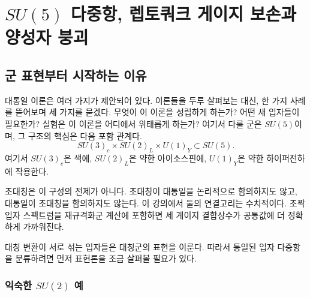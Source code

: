 \chapter{\texorpdfstring{\(SU(5)\)}{5} 다중항, 렙토쿼크 게이지 보손과 양성자 붕괴}


\section{군 표현부터 시작하는 이유}

대통일 이론은 여러 가지가 제안되어 있다. 이론들을 두루 살펴보는 대신, 한 가지 사례를 뜯어보며 세 가지를 묻겠다. 무엇이 이 이론을 성립하게 하는가? 어떤 새 입자들이 필요한가? 실험은 이 이론을 어디에서 위태롭게 하는가? 여기서 다룰 군은 \(SU(5)\)이며, 그 구조의 핵심은 다음 포함 관계다.
\begin{equation}
SU(3)_c\times SU(2)_L\times U(1)_Y
\subset SU(5).
\label{eq:l10-sm-embedding}
\end{equation}
여기서 \(SU(3)_c\)은 색에, \(SU(2)_L\)은 약한 아이소스핀에, \(U(1)_Y\)은 약한 하이퍼전하에 작용한다.

초대칭은 이 구성의 전제가 아니다. 초대칭이 대통일을 논리적으로 함의하지도 않고, 대통일이 초대칭을 함의하지도 않는다. 이 강의에서 둘의 연결고리는 수치적이다. 초짝입자 스펙트럼을 재규격화군 계산에 포함하면 세 게이지 결합상수가 공통값에 더 정확하게 가까워진다.

대칭 변환이 서로 섞는 입자들은 대칭군의 표현을 이룬다. 따라서 통일된 입자 다중항을 분류하려면 먼저 표현론을 조금 살펴볼 필요가 있다.

\subsection{익숙한 \texorpdfstring{\(SU(2)\)}{2} 예}

